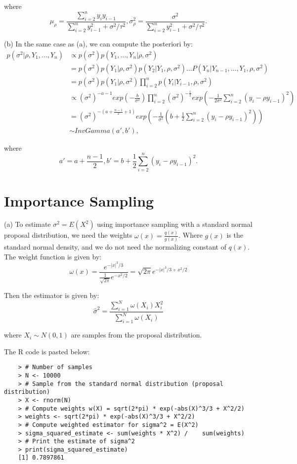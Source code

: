 \documentclass{article}
\begin{document}
where 
$$
\mu_\rho = \frac{\sum_{i=2}^ny_iy_{i-1}}{\sum_{i=2}^ny_{i-1}^2+\sigma^2/\tau^2},\sigma^2_\rho=\frac{\sigma^2}{\sum_{i=2}^ny_{i-1}^2+\sigma^2/\tau^2}.
$$

(b) In the same case as (a), we can compute the posteriori by:
\begin{align*}
    p(\sigma^2|\rho,Y_1,\dots,Y_n)
    &\propto p(\sigma^2)p(Y_1,\dots,Y_n|\rho,\sigma^2) \\
    &= p(\sigma^2)p(Y_1|\rho,\sigma^2)p(Y_2|Y_1,\rho,\sigma^2)\dots P(Y_n|Y_{n-1},\dots,Y_{1},\rho,\sigma^2)\\
    &=p(\sigma^2)p(Y_1|\rho,\sigma^2)\prod_{i=2}^{n}p(Y_i|Y_{i-1},\rho,\sigma^2)\\
    &\propto (\sigma^2)^{-a-1}exp\left(-\frac{b}{\sigma^2} \right)\prod_{i=2}^n(\sigma^2)^{-\frac{1}{2}}exp\left( -\frac{1}{2\sigma^2}\sum_{i=2}^n(y_i-\rho y_{i-1})^2\right)\\
    &=(\sigma^2)^{-(a+\frac{n-1}{2}+1)}exp\left( -\frac{1}{\sigma^2}\left(b+\frac{1}{2}\sum_{i=2}^n(y_i-\rho y_{i-1})^2\right) \right) \\
    &\sim InvGamma(a',b'),
\end{align*}

where
$$
a'= a +\frac{n-1}{2}, b'=b + \frac{1}{2}\sum_{i=2}^n(y_i-\rho y_{i-1})^2.
$$

\section{Importance Sampling}
(a) To estimate $\sigma^2 = E(X^2)$ using importance sampling with a standard normal proposal distribution, we need the weights $\omega(x)=\frac{q(x)}{g(x)}$. Where $g(x)$ is the standard normal density, and we do not need the normalizing constant of $q(x)$. The weight function is given by:
$$
\omega(x) =  \frac{e^{-|x|^3/3}}{\frac{1}{\sqrt{2\pi}} e^{-x^2/2}} = \sqrt{2\pi} e^{-|x|^3/3 + x^2/2}
$$

Then the estimator is given by:
  \[
   \hat{\sigma}^2 = \frac{\sum_{i=1}^N \omega(X_i) X_i^2}{\sum_{i=1}^N \omega(X_i)}
   \]
   
where \( X_i \sim N(0, 1) \) are samples from the proposal distribution.

The R code is pasted below:
\begin{verbatim}
    > # Number of samples
    > N <- 10000
    > # Sample from the standard normal distribution (proposal distribution)
    > X <- rnorm(N)
    > # Compute weights w(X) = sqrt(2*pi) * exp(-abs(X)^3/3 + X^2/2)
    > weights <- sqrt(2*pi) * exp(-abs(X)^3/3 + X^2/2)
    > # Compute weighted estimator for sigma^2 = E(X^2)
    > sigma_squared_estimate <- sum(weights * X^2) /    sum(weights)
    > # Print the estimate of sigma^2
    > print(sigma_squared_estimate)
    [1] 0.7897861 
\end{verbatim}
\end{document}
